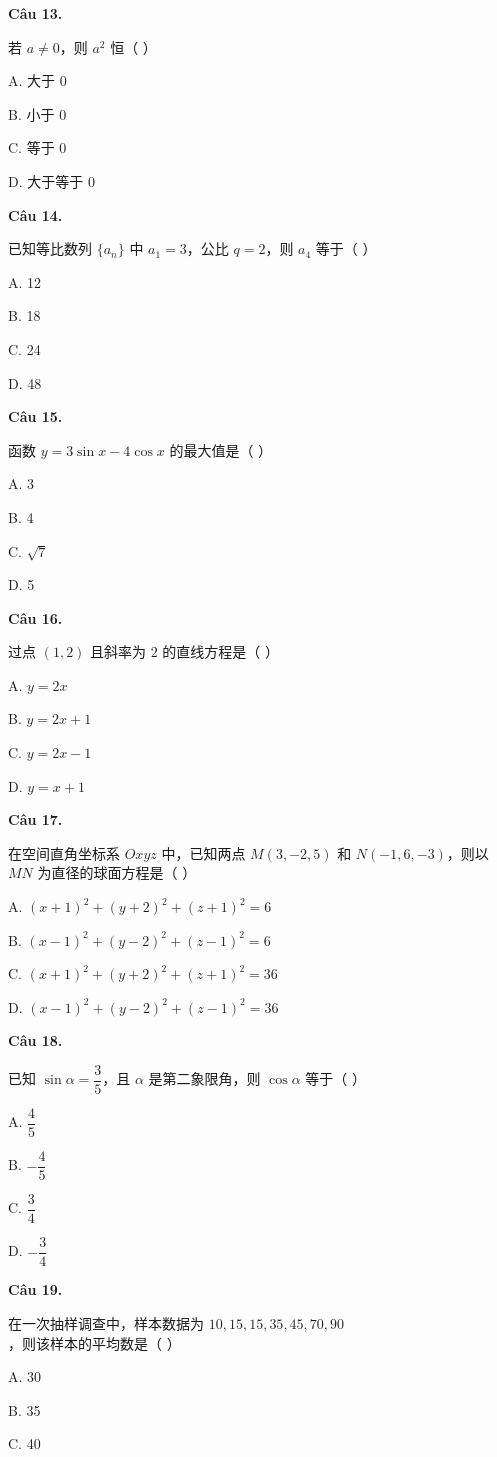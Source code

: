 \documentclass[11pt, a4paper]{article}
\begin{document}
\textbf{Câu 13.}

若 $a\ne0$，则 $a^2$ 恒（ ）

A. 大于 $0$

B. 小于 $0$

C. 等于 $0$

D. 大于等于 $0$

\textbf{Câu 14.}

已知等比数列 $\{a_n\}$ 中 $a_1=3$，公比 $q=2$，则 $a_4$ 等于（ ）

A. 12

B. 18

C. 24

D. 48

\textbf{Câu 15.}

函数 $y=3\sin x-4\cos x$ 的最大值是（ ）

A. 3

B. 4

C. $\sqrt{7}$

D. 5

\textbf{Câu 16.}

过点 $(1,2)$ 且斜率为 $2$ 的直线方程是（ ）

A. $y=2x$

B. $y=2x+1$

C. $y=2x-1$

D. $y=x+1$

\textbf{Câu 17.}

在空间直角坐标系 $Oxyz$ 中，已知两点 $M(3,-2,5)$ 和 $N(-1,6,-3)$，则以 $MN$ 为直径的球面方程是（ ）

A. $(x+1)^2+(y+2)^2+(z+1)^2=6$

B. $(x-1)^2+(y-2)^2+(z-1)^2=6$

C. $(x+1)^2+(y+2)^2+(z+1)^2=36$

D. $(x-1)^2+(y-2)^2+(z-1)^2=36$

\textbf{Câu 18.}

已知 $\sin\alpha=\dfrac{3}{5}$，且 $\alpha$ 是第二象限角，则 $\cos\alpha$ 等于（ ）

A. $\dfrac{4}{5}$

B. $-\dfrac{4}{5}$

C. $\dfrac{3}{4}$

D. $-\dfrac{3}{4}$

\textbf{Câu 19.}

在一次抽样调查中，样本数据为 $10,15,15,35,45,70,90$，则该样本的平均数是（ ）

A. 30

B. 35

C. 40
\end{document}
